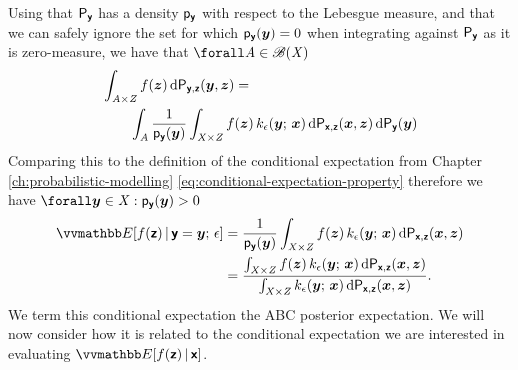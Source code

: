 Using that $\mathsf{P}_{\boldsymbol{\mathsf{y}}}$ has a density $\mathsf{p}_{\boldsymbol{\mathsf{y}}}$ with respect to the Lebesgue measure, and that we can safely ignore the set for which $\mathsf{p}_{\boldsymbol{\mathsf{y}}}(\boldsymbol{y}) = 0$ when integrating against $\mathsf{P}_{\boldsymbol{\mathsf{y}}}$ as it is zero-measure, we have that $\forall \set{A} \in \borel(\set{X})$
\begin{equation}\label{eq:abc-conditional-expectation-derivation-4}
\begin{split}
  &\int_{\mathit{A} \times \mathit{Z}} 
    f(\boldsymbol{z}) 
  \,\mathrm{d}\mathsf{P}_{\boldsymbol{\mathsf{y}},\boldsymbol{\mathsf{z}}}(\boldsymbol{y},\boldsymbol{z}) 
  =\,\\
  &\qquad
  \int_{\mathit{A}} \frac{1}{\mathsf{p}_{\boldsymbol{\mathsf{y}}}(\boldsymbol{y})}
  \int_{\mathit{X}\times\mathit{Z}}
    f(\boldsymbol{z})\,k_{\epsilon}(\boldsymbol{y};\,\boldsymbol{x})
  \,\mathrm{d}\mathsf{P}_{\boldsymbol{\mathsf{x}},\boldsymbol{\mathsf{z}}}(\boldsymbol{x},\boldsymbol{z})\,\mathrm{d}\mathsf{P}_{\boldsymbol{\mathsf{y}}}(\boldsymbol{y})
\end{split}
\end{equation}
Comparing this to the definition of the conditional expectation from Chapter \ref{ch:probabilistic-modelling} \eqref{eq:conditional-expectation-property} therefore we have $\forall \vct{y} \in \set{X} : \pden{\rvct{y}}(\vct{y}) > 0$
\begin{align}
  \label{eq:abc-expectation-1}
  \expc{f(\rvct{z}) \gvn \rvct{y} = \vct{y};\,\epsilon} 
  &=
  \frac{1}{\pden{\rvct{y}}(\vct{y})}
  \int_{\set{X}\times\set{Z}}
    f(\vct{z})\,k_{\epsilon}(\vct{y};\,\vct{x})
  \,\dr\prob{\rvct{x},\rvct{z}}(\vct{x},\vct{z})
  \\
  \label{eq:abc-expectation-2}
  &=
  \frac{
  \int_{\set{X}\times\set{Z}}
    f(\vct{z})\,k_{\epsilon}(\vct{y};\,\vct{x})
  \,\dr\prob{\rvct{x},\rvct{z}}(\vct{x},\vct{z})
  }
  {
  \int_{\set{X}\times\set{Z}}
    k_\epsilon(\vct{y};\,\vct{x})\,
  \dr\prob{\rvct{x},\rvct{z}}(\vct{x},\vct{z})
  }.
\end{align}
We term this conditional expectation the \ac{ABC} posterior expectation. We will now consider how it is related to the conditional expectation we are interested in evaluating $\expc{f(\rvct{z}) \gvn \rvct{x}}$.

